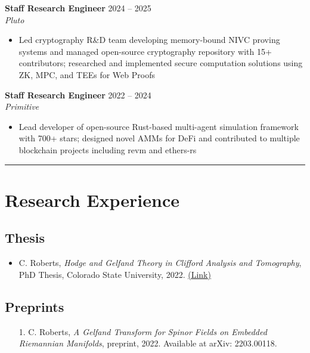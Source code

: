 \documentclass[12pt]{article} %
\begin{document}
\begin{flushleft}
\textbf{Staff Research Engineer} \hfill 2024 -- 2025\\
\emph{Pluto} \hfill \\
\begin{itemize}
    \item Led cryptography R\&D team developing memory-bound NIVC proving systems and managed open-source cryptography repository with 15+ contributors; researched and implemented secure computation solutions using ZK, MPC, and TEEs for Web Proofs
\end{itemize}

\vspace*{10pt}
\textbf{Staff Research Engineer} \hfill 2022 -- 2024\\
\emph{Primitive} \hfill \\
\begin{itemize}
    \item Lead developer of open-source Rust-based multi-agent simulation framework with 700+ stars; designed novel AMMs for DeFi and contributed to multiple blockchain projects including revm and ethers-rs
\end{itemize}
\end{flushleft}

\rule{\textwidth}{0.5mm}


\section{Research Experience}
\subsection{Thesis}
\begin{itemize}[leftmargin=*]
    \item C. Roberts, \textit{Hodge and Gelfand Theory in Clifford Analysis and Tomography}, PhD Thesis, Colorado State University, 2022. \href{https://mountainscholar.org/items/a9071681-3f20-4807-b69f-e08fe082637d}{(\underline{Link})}
\end{itemize}

\subsection{Preprints}
\begin{itemize}[leftmargin=*]
    \item[1.] C. Roberts, \textit{A Gelfand Transform for Spinor Fields on Embedded Riemannian Manifolds}, preprint, 2022. Available at arXiv: 2203.00118.
\end{itemize}
\end{document}
